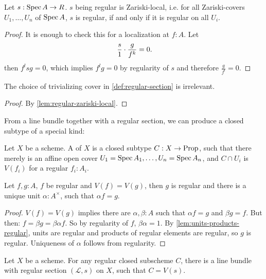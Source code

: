 \begin{lemma}%
  \label{lem:regular-zariski-local}
  Let $s:\operatorname{Spec} A\to R$.
  $s$ being regular is Zariski-local, i.e.
  for all Zariski-covers $U_1,\dots,U_n$ of $\operatorname{Spec} A$,
  $s$ is regular, if and only if it is regular on all $U_i$.
\end{lemma}

\begin{proof}
  It is enough to check this for a localization at $f:A$.
  Let
  \[ \frac{s}{1}\cdot\frac{g}{f^k}=0\rlap{.} \]
  then $f^lsg=0$, which implies $f^lg=0$ by regularity of $s$ and therefore $\frac{g}{f^l}=0$.
\end{proof}

\begin{proposition}%
  The choice of trivializing cover in \cref{def:regular-section}
  is irrelevant.
\end{proposition}

\begin{proof}
  By \cref{lem:regular-zariski-local}.
\end{proof}

From a line bundle together with a regular section,
we can produce a closed subtype of a special kind:

\begin{definition}%
  Let $X$ be a scheme.
  A  of $X$ is a closed subtype
  $C:X\to \mathrm{Prop}$, such that there merely is an affine open cover $U_1=\operatorname{Spec} A_1,\dots,U_n=\operatorname{Spec} A_n$,
  and $C\cap U_i$ is $V(f_i)$ for a regular $f_i:A_i$.
\end{definition}

\begin{lemma}%
  Let $f,g:A$, $f$ be regular and $V(f)=V(g)$,
  then $g$ is regular and there is a unique unit $\alpha:A^\times$, such that $\alpha f=g$.
\end{lemma}

\begin{proof}
  $V(f)=V(g)$ implies there are $\alpha,\beta:A$ such that
  $\alpha f = g$ and $\beta g = f$.
  But then: $f=\beta g=\beta\alpha f$.
  So by regularity of $f$, $\beta\alpha=1$.
  By \cref{lem:units-products-regular}, units are regular and products of regular elements are regular,
  so $g$ is regular.
  Uniqueness of $\alpha$ follows from regularity.
\end{proof}

\begin{theorem}%
  Let $X$ be a scheme.
  For any regular closed subscheme $C$,
  there is a line bundle with regular section $(\mathcal L,s)$ on $X$,
  such that $C=V(s)$.
\end{theorem}

